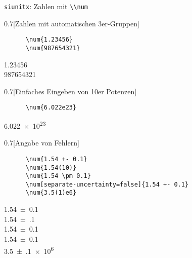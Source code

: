 \begin{frame}[fragile]{\texttt{siunitx}: Zahlen mit \lstinline+\\num+}
  \begin{CodeExample}{0.7}[Zahlen mit automatischen 3er-Gruppen]
    \begin{lstlisting}
      \num{1.23456}
      \num{987654321}
    \end{lstlisting}
  \CodeResult
    \strut
    \num{1.23456} \\
    \num{987654321}
  \end{CodeExample}
  \begin{CodeExample}{0.7}[Einfaches Eingeben von 10er Potenzen]
    \begin{lstlisting}
      \num{6.022e23}
    \end{lstlisting}
  \CodeResult
    \strut
    \num{6.022e23}
  \end{CodeExample}
  \begin{CodeExample}{0.7}[Angabe von Fehlern]
    \begin{lstlisting}
      \num{1.54 +- 0.1}
      \num{1.54(10)}
      \num{1.54 \pm 0.1}
      \num[separate-uncertainty=false]{1.54 +- 0.1}
      \num{3.5(1)e6}
    \end{lstlisting}
  \CodeResult
    \strut
    \num{1.54 +- 0.1} \\
    \num{1.54(10)} \\
    \num{1.54 \pm 0.1} \\
    \num[separate-uncertainty=false]{1.54 +- 0.1} \\
    \num{3.5(1)e6}
  \end{CodeExample}
\end{frame}

